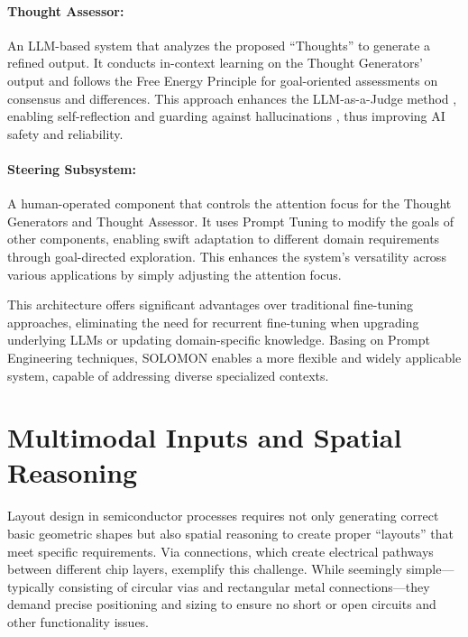 \documentclass{article}
\begin{document}
\paragraph{Thought Assessor:} An LLM-based system that analyzes the proposed ``Thoughts'' to generate a refined output. It conducts in-context learning on the Thought Generators' output and follows the Free Energy Principle for goal-oriented assessments on consensus and differences. This approach enhances the LLM-as-a-Judge method \cite{zheng2023judgingllmasajudgemtbenchchatbot, lin2023llmevalunifiedmultidimensionalautomatic}, enabling self-reflection \cite{ji2023mitigatinghallucinationlargelanguage} and guarding against hallucinations \cite{guerreiro2023lookingneedlehaystackcomprehensive}, thus improving AI safety and reliability.

\paragraph{Steering Subsystem:} A human-operated component that controls the attention focus for the Thought Generators and Thought Assessor. It uses Prompt Tuning to modify the goals of other components, enabling swift adaptation to different domain requirements through goal-directed exploration. This enhances the system's versatility across various applications by simply adjusting the attention focus.

This architecture offers significant advantages over traditional fine-tuning approaches, eliminating the need for recurrent fine-tuning when upgrading underlying LLMs or updating domain-specific knowledge. Basing on Prompt Engineering techniques, SOLOMON enables a more flexible and widely applicable system, capable of addressing diverse specialized contexts.

\section{Multimodal Inputs and Spatial Reasoning}
\label{sec:problem}
Layout design in semiconductor processes requires not only generating correct basic geometric shapes but also spatial reasoning to create proper ``layouts'' that meet specific requirements. Via connections, which create electrical pathways between different chip layers, exemplify this challenge. While seemingly simple—typically consisting of circular vias and rectangular metal connections—they demand precise positioning and sizing to ensure no short or open circuits and other functionality issues.
\end{document}
